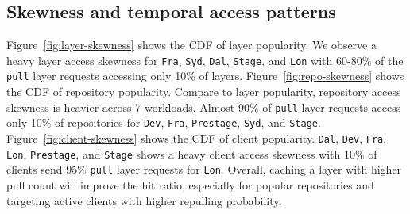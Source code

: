 %

\subsection{Skewness and temporal access patterns}



Figure~\ref{fig:layer-skewness} shows the CDF of layer popularity.
We observe a heavy layer access skewness for \texttt{Fra}, \texttt{Syd}, \texttt{Dal}, \texttt{Stage}, and \texttt{Lon} with 60-80\%  of the \texttt{pull} layer requests accessing only 10\% of layers.
Figure~\ref{fig:repo-skewness} shows the CDF of repository popularity.
Compare to layer popularity, 
repository access skewness is heavier across 7 workloads.
Almost 90\% of \texttt{pull} layer requests access only 10\% of repositories for 
\texttt{Dev}, \texttt{Fra}, \texttt{Prestage}, \texttt{Syd}, and \texttt{Stage}.
Figure~\ref{fig:client-skewness} shows the CDF of client popularity.
\texttt{Dal}, \texttt{Dev}, \texttt{Fra}, \texttt{Lon}, \texttt{Prestage}, and \texttt{Stage} shows a heavy client access skewness with
10\% of clients send 95\% \texttt{pull} layer requests for \texttt{Lon}.
Overall, caching a layer with higher pull count will improve the hit ratio, 
especially for popular repositories and targeting active clients with higher repulling probability. 

